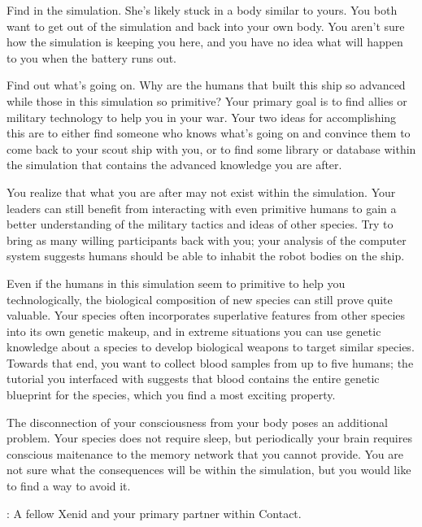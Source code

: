 \documentclass[char]{guildcamp1}
\begin{document}
\begin{itemz}[Goals]
  \item Find \cPassive{\name} in the simulation. She's likely stuck in a body similar to yours. You both want to get out of the simulation and back into your own body. You aren't sure how the simulation is keeping you here, and you have no idea what will happen to you when the battery runs out.
  \item Find out what's going on. Why are the humans that built this ship so advanced while those in this simulation so primitive? Your primary goal is to find allies or military technology to help you in your war. Your two ideas for accomplishing this are to either find someone who knows what's going on and convince them to come back to your scout ship with you, or to find some library or database within the simulation that contains the advanced knowledge you are after.
  \item You realize that what you are after may not exist within the simulation. Your leaders can still benefit from interacting with even primitive humans to gain a better understanding of the military tactics and ideas of other species. Try to bring as many willing participants back with you; your analysis of the computer system suggests humans should be able to inhabit the robot bodies on the ship.
  \item Even if the humans in this simulation seem to primitive to help you technologically, the biological composition of new species can still prove quite valuable. Your species often incorporates superlative features from other species into its own genetic makeup, and in extreme situations you can use genetic knowledge about a species to develop biological weapons to target similar species. Towards that end, you want to collect blood samples from up to five humans; the tutorial you interfaced with suggests that blood contains the entire genetic blueprint for the species, which you find a most exciting property. %
  \item The disconnection of your consciousness from your body poses an additional problem. Your species does not require sleep, but periodically your brain requires conscious maitenance to the memory network that you cannot provide. You are not sure what the consequences will be within the simulation, but you would like to find a way to avoid it. %
\end{itemz}


\begin{contacts}
  \contact{\cPassive{}}: A fellow Xenid and your primary partner within Contact.
\end{contacts}
\end{document}
